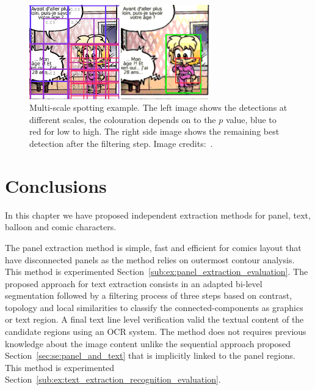  \begin{figure}[!ht]  %
   \centering
  \includegraphics[trim= 0px 1px 0mm 0mm, clip,width=0.7\textwidth]{filtering.png}
  \caption[Multi-scale comic character spotting]{Multi-scale spotting example. The left image shows the detections at different scales, the colouration depends on to the $p$ value, blue to red for low to high. The right side image shows the remaining best detection after the filtering step. Image credits:~\cite{Bubble08}. }
  \label{fig:in:filtering}
 \end{figure}



\section{Conclusions}
\label{sec:in:conclusion}

In this chapter we have proposed independent extraction methods for panel, text, balloon and comic characters.

The panel extraction method is simple, fast and efficient for comics layout that have disconnected panels as the method relies on outermost contour analysis.
This method is experimented Section~\ref{sub:ex:panel_extraction_evaluation}.
The proposed approach for text extraction consists in an adapted bi-level segmentation followed by a filtering process of three steps based on contrast, topology and local similarities to classify the connected-components as graphics or text region.
A final text line level verification valid the textual content of the candidate regions using an OCR system.
The method does not requires previous knowledge about the image content unlike the sequential approach proposed Section~\ref{sec:se:panel_and_text} that is implicitly linked to the panel regions.
This method is experimented Section~\ref{sub:ex:text_extraction_recognition_evaluation}.

